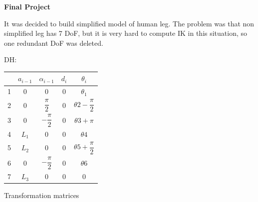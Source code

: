 \documentclass[12pt]{article}
\begin{document}


\begin{center}
\textbf{Final Project}
\end{center}

It was decided to build simplified model of human leg. The problem was that non simplified leg has 7 DoF, but it is very hard to compute IK in this situation, so one redundant DoF was deleted.

\bigskip
\bigskip
\bigskip 

DH:
\\
\begin{tabular}{|c|c|c|c|c|}
\hline
 & $a_{i-1}$ & $\alpha_{i-1}$ & $d_i$ & $\theta_i$ \\
 \hline
 1 & 0 & 0 & 0 & $\theta_1$\\
 2 & 0 & $\dfrac{\pi}{2}$ & 0 & $\theta2 - \dfrac{\pi}{2}$\\
 3 & 0 & $-\dfrac{\pi}{2}$ & 0 & $\theta3 + \pi$\\
 4 & $L_1$  & 0 & 0 & $\theta4$\\
 5 & $L_2$ & 0 & 0 & $\theta5 + \dfrac{\pi}{2}$\\
 6 & 0 & $-\dfrac{\pi}{2}$ & 0 & $\theta6$\\
 7 & $L_3$ & 0 & 0 & 0\\ 
\hline
\end{tabular}

\bigskip

Transformation matrices
\end{document}
